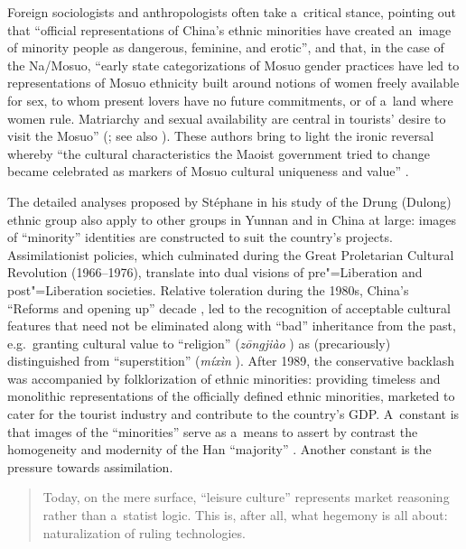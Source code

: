 Foreign sociologists and anthropologists often take a~critical stance,
pointing out that “official representations of China’s ethnic minorities have created an~image of
minority people as dangerous, feminine, and erotic”, and that, in the case of the
Na/{\allowbreak}Mosuo, “early state categorizations of Mosuo gender practices have led to
representations of Mosuo ethnicity built around notions of women freely available for sex, to whom
present lovers have no future commitments, or of a~land where women rule. Matriarchy and sexual
availability are central in tourists’ desire to visit the Mosuo” (\citealt[449–450]{walsh2005}; see also \citealt{schein1997, blumenfield2010}). These authors bring to light the ironic reversal whereby “the cultural characteristics the Maoist
government tried to change became celebrated as markers of Mosuo cultural uniqueness and value”
\citep[457]{walsh2005}.

The detailed analyses proposed by Stéphane \citet{gros2001} in his study of the
Drung (Dulong) ethnic group also apply to other groups in Yunnan and in China at large: images of
“minority” identities are constructed to suit the country’s projects. Assimilationist policies,
which culminated during the Great Proletarian Cultural Revolution (1966--1976), translate into dual
visions of pre"=Liberation and post"=Liberation societies. Relative toleration during the 1980s,
China’s “Reforms and opening up” decade \citep{zhu2014}, led to the recognition of acceptable cultural
features that need not be eliminated along with “bad” inheritance from the past, e.g.\ granting
cultural value to “religion” (\textit{zōngjiào} ) as (precariously) distinguished from “superstition” (\textit{míxìn} ).
After 1989, the {conservative} backlash was accompanied by folklorization of ethnic minorities:
providing timeless and monolithic representations of the officially defined ethnic minorities,
marketed to cater for the tourist industry and contribute to the country’s GDP. A~constant is that
images of the “minorities” serve as a~means to assert by contrast the homogeneity and modernity of
the Han “majority” \citep[31]{gros2001}. Another constant is the pressure towards {assimilation}.

\begin{quotation}
	Today, on the mere surface, “leisure culture” represents market reasoning rather than a~statist logic. This is, after all, what hegemony is all about: naturalization of ruling technologies. \citep[242]{sigley2013} 
\end{quotation}

